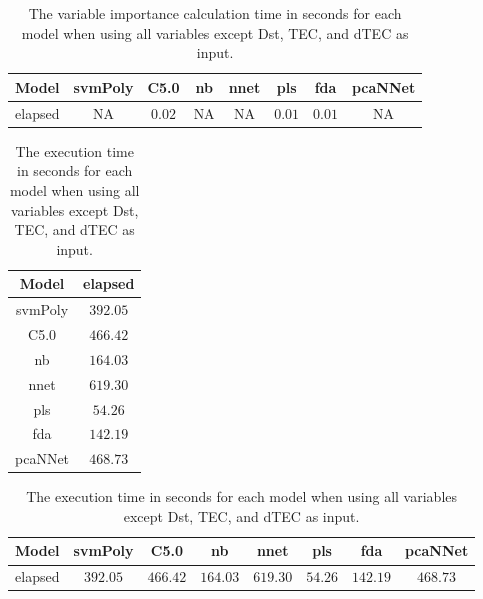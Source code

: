 \begin{table}[!ht]
	\centering
	\begin{tabular}{|c|c|c|c|c|c|c|c|}
		\hline
		Model & svmPoly & C5.0 & nb & nnet & pls & fda & pcaNNet \\ \hline
		elapsed & NA & $0.02$ & NA & NA & $0.01$ & $0.01$ & NA \\ \hline
	\end{tabular}
	\caption{The variable importance calculation time in seconds for each model when using all variables except Dst, TEC, and dTEC as input.}
	\label{tab:time:reverse:noTEC:importance}
\end{table}

\begin{table}[!ht]
	\centering
	\begin{tabular}{|c|c|}
		\hline
		Model & elapsed \\ \hline
		svmPoly & $392.05$ \\ \hline
		C5.0 & $466.42$ \\ \hline
		nb & $164.03$ \\ \hline
		nnet & $619.30$ \\ \hline
		pls & $54.26$ \\ \hline
		fda & $142.19$ \\ \hline
		pcaNNet & $468.73$ \\ \hline
	\end{tabular}
	\caption{The execution time in seconds for each model when using all variables except Dst, TEC, and dTEC as input.}
	\label{tab:time:noTEC:total}
\end{table}

\begin{table}[!ht]
	\centering
	\begin{tabular}{|c|c|c|c|c|c|c|c|}
		\hline
		Model & svmPoly & C5.0 & nb & nnet & pls & fda & pcaNNet \\ \hline
		elapsed & $392.05$ & $466.42$ & $164.03$ & $619.30$ & $54.26$ & $142.19$ & $468.73$ \\ \hline
	\end{tabular}
	\caption{The execution time in seconds for each model when using all variables except Dst, TEC, and dTEC as input.}
	\label{tab:time:reverse:noTEC:total}
\end{table}

